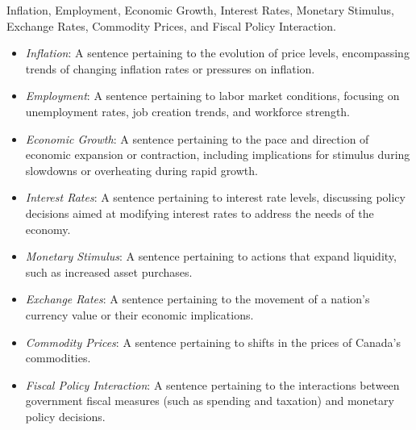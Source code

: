  Inflation, Employment, Economic Growth, Interest Rates, Monetary Stimulus, Exchange Rates, Commodity Prices, and Fiscal Policy Interaction.


\begin{itemize} 
    \item \emph{Inflation}: A sentence pertaining to the evolution of price levels, encompassing trends of changing inflation rates or pressures on inflation. 
    \item \emph{Employment}: A sentence pertaining to labor market conditions, focusing on unemployment rates, job creation trends, and workforce strength. 
    \item \emph{Economic Growth}: A sentence pertaining to the pace and direction of economic expansion or contraction, including implications for stimulus during slowdowns or overheating during rapid growth. 
    \item \emph{Interest Rates}: A sentence pertaining to interest rate levels, discussing policy decisions aimed at modifying interest rates to address the needs of the economy. 
    \item \emph{Monetary Stimulus}: A sentence pertaining to actions that expand liquidity, such as increased asset purchases. 
    \item \emph{Exchange Rates}: A sentence pertaining to the movement of a nation's currency value or their economic implications. 
    \item \emph{Commodity Prices}: A sentence pertaining to shifts in the prices of Canada's commodities. 
    \item \emph{Fiscal Policy Interaction}: A sentence pertaining to the interactions between government fiscal measures (such as spending and taxation) and monetary policy decisions.
\end{itemize}

